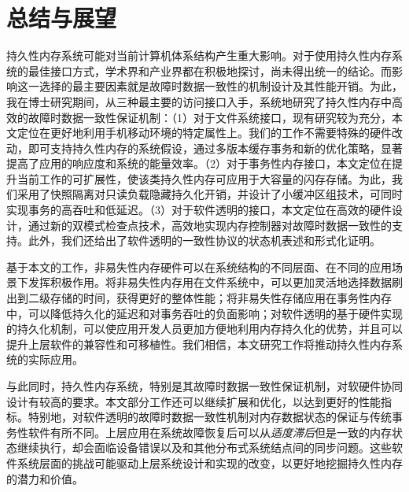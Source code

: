 \chapter{总结与展望}
\label{chap:conclusion}

持久性内存系统可能对当前计算机体系结构产生重大影响。对于使用持久性内存系统的最佳接口方式，学术界和产业界都在积极地探讨，尚未得出统一的结论。而影响这一选择的最主要因素就是故障时数据一致性的机制设计及其性能开销。为此，我在博士研究期间，从三种最主要的访问接口入手，系统地研究了持久性内存中高效的故障时数据一致性保证机制：（1）对于文件系统接口，现有研究较为充分，本文定位在更好地利用手机移动环境的特定属性上。我们的工作不需要特殊的硬件改动，即可支持持久性内存的系统假设，通过多版本缓存事务和新的优化策略，显著提高了应用的响应度和系统的能量效率。（2）对于事务性内存接口，本文定位在提升当前工作的可扩展性，使该类持久性内存可应用于大容量的闪存存储。为此，我们采用了快照隔离对只读负载隐藏持久化开销，并设计了小缓冲区组技术，可同时实现事务的高吞吐和低延迟。（3）对于软件透明的接口，本文定位在高效的硬件设计，通过新的双模式检查点技术，高效地实现内存控制器对故障时数据一致性的支持。此外，我们还给出了软件透明的一致性协议的状态机表述和形式化证明。

基于本文的工作，非易失性内存硬件可以在系统结构的不同层面、在不同的应用场景下发挥积极作用。将非易失性内存用在文件系统中，可以更加灵活地选择数据刷出到二级存储的时间，获得更好的整体性能；将非易失性存储应用在事务性内存中，可以降低持久化的延迟和对事务吞吐的负面影响；对软件透明的基于硬件实现的持久化机制，可以使应用开发人员更加方便地利用内存持久化的优势，并且可以提升上层软件的兼容性和可移植性。我们相信，本文研究工作将推动持久性内存系统的实际应用。

与此同时，持久性内存系统，特别是其故障时数据一致性保证机制，对软硬件协同设计有较高的要求。本文部分工作还可以继续扩展和优化，以达到更好的性能指标。特别地，对软件透明的故障时数据一致性机制对内存数据状态的保证与传统事务性软件有所不同。上层应用在系统故障恢复后可以从\emph{适度滞后}但是一致的内存状态继续执行，却会面临设备错误以及和其他分布式系统结点间的同步问题。这些软件系统层面的挑战可能驱动上层系统设计和实现的改变，以更好地挖掘持久性内存的潜力和价值。
